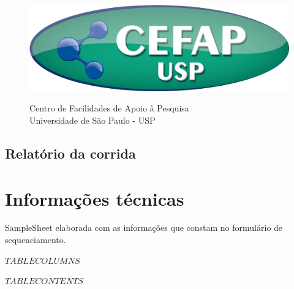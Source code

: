 \documentclass[a4paper]{article}
\begin{document}
\begin{figure}[!htb]
    \centering
    \begin{minipage}{.5\textwidth}
        \centering
        \includegraphics[scale = 0.27]{logo_CEFAP.png}
    \end{minipage}%
    \begin{minipage}{0.5\textwidth}
        \centering
        Centro de Facilidades de Apoio à Pesquisa\\
        Universidade de São Paulo - USP
    \end{minipage}
\end{figure}

\begin{center}

\section*{Relatório da corrida}

\end{center}

\section*{Informações técnicas}

SampleSheet elaborada com as informações que constam no formulário de sequenciamento.

\begin{footnotesize}
\begin{longtable}$TABLECOLUMNS$
\caption{Detalhes da corrida realizada no equipamento $EQUIPAMENTO$.}
\label{TabDetalhesCorrida}
\endfirsthead
\hline
$TABLECONTENTS$
\end{longtable}
\end{footnotesize}
\end{document}

